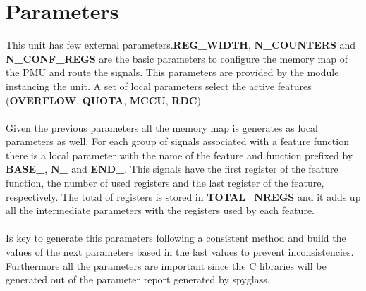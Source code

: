 \section{Parameters}
\label{chapter3}
This unit has few external parameters.\textbf{REG\_WIDTH}, \textbf{N\_COUNTERS} and \textbf{N\_CONF\_REGS} are the basic parameters to configure the memory map of the PMU and route the signals. This parameters are provided by the module instancing the unit. A set of local parameters select the active features (\textbf{OVERFLOW}, \textbf{QUOTA}, \textbf{MCCU}, \textbf{RDC}).\\
\\
Given the previous parameters all the memory map is generates as local parameters as well. For each group of signals associated with a feature function there is a local parameter with the name of the feature and function prefixed by \textbf{BASE\_}, \textbf{N\_} and \textbf{END\_}. This signals have the first register of the feature function, the number of used registers and the last register of the feature, respectively. The total of registers is stored in \textbf{TOTAL\_NREGS} and it adds up all the intermediate parameters with the registers used by each feature.\\
\\
Is key to generate this parameters following a consistent method and build the values of the next parameters based in the last values to prevent inconsistencies. Furthermore all the parameters are important since the C libraries will be generated out of the parameter report generated by spyglass.